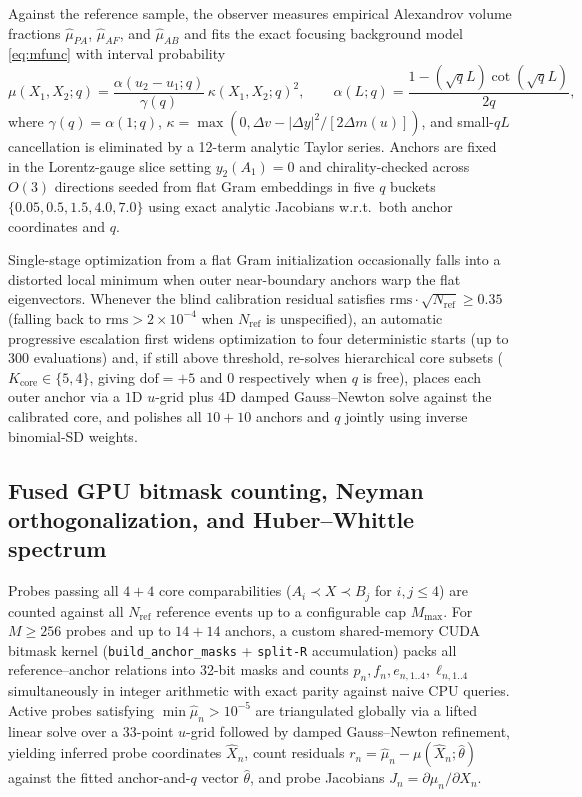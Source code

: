 \documentclass[11pt,a4paper]{article}
\begin{document}
Against the reference sample, the observer measures empirical Alexandrov volume
fractions $\hat{\mu}_{PA}$, $\hat{\mu}_{AF}$, and $\hat{\mu}_{AB}$ and fits the
exact focusing background model \eqref{eq:mfunc} with interval probability
\begin{equation}
 \mu(X_1, X_2; q) = \frac{\alpha(u_2 - u_1; q)}{\gamma(q)}\,\kappa(X_1,X_2; q)^2,
 \qquad
 \alpha(L; q) = \frac{1 - (\sqrt{q}L)\cot(\sqrt{q}L)}{2q},
 \label{eq:bgprob}
\end{equation}
where $\gamma(q) = \alpha(1; q)$, $\kappa = \max(0, \Delta v - |\Delta y|^2 / [2\Delta m(u)])$,
and small-$q L$ cancellation is eliminated by a 12-term analytic Taylor series.
Anchors are fixed in the Lorentz-gauge slice setting $y_2(A_1) = 0$ and
chirality-checked across $O(3)$ directions seeded from flat Gram embeddings in
five $q$ buckets $\{0.05, 0.5, 1.5, 4.0, 7.0\}$ using exact analytic Jacobians
w.r.t.\ both anchor coordinates and $q$.

Single-stage optimization from a flat Gram initialization occasionally falls
into a distorted local minimum when outer near-boundary anchors warp the flat
eigenvectors. Whenever the blind calibration residual satisfies
$\text{rms}\cdot \sqrt{N_{\text{ref}}} \ge 0.35$ (falling back to $\text{rms} > 2\times 10^{-4}$ when $N_{\text{ref}}$ is unspecified),
an automatic progressive escalation first widens optimization to four
deterministic starts (up to $300$ evaluations) and, if still above threshold,
re-solves hierarchical core subsets ($K_{\text{core}} \in \{5,4\}$, giving $\text{dof}=+5$
and $0$ respectively when $q$ is free), places each outer anchor via a $1\text{D}$
$u$-grid plus $4\text{D}$ damped Gauss--Newton solve against the calibrated core,
and polishes all $10{+}10$ anchors and $q$ jointly using inverse binomial-SD
weights.

\subsection{Fused GPU bitmask counting, Neyman orthogonalization, and Huber--Whittle spectrum}
Probes passing all $4{+}4$ core comparabilities ($A_i \prec X \prec B_j$ for
$i,j \le 4$) are counted against all $N_{\text{ref}}$ reference events up to a
configurable cap $M_{\max}$. For $M \ge 256$ probes and up to $14{+}14$ anchors,
a custom shared-memory CUDA bitmask kernel (\texttt{build\_anchor\_masks} + \texttt{split-R}
accumulation) packs all reference--anchor relations into 32-bit masks and counts
$p_n, f_n, e_{n,1..4}, \ell_{n,1..4}$ simultaneously in integer arithmetic with
exact parity against naive CPU queries. Active probes satisfying
$\min \hat{\mu}_n > 10^{-5}$ are triangulated globally via a lifted linear solve
over a 33-point $u$-grid followed by damped Gauss--Newton refinement, yielding
inferred probe coordinates $\hat{X}_n$, count residuals
$r_n = \hat{\mu}_n - \mu(\hat{X}_n; \hat{\theta})$ against the fitted anchor-and-$q$
vector $\hat{\theta}$, and probe Jacobians $J_n = \partial \mu_n / \partial X_n$.
\end{document}
